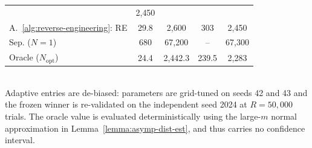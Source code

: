 \begin{table}[ht]
\begin{tabular}{l c c c c}
& 2{,}450\hspace{0.45em}{\scriptsize [2{,}420, 2{,}480]} \\
A.~\ref{alg:reverse-engineering}: RE
& 29.8\hspace{0.45em}{\scriptsize [29.2, 30.3]}
& 2{,}600\hspace{0.45em}{\scriptsize [2{,}570, 2{,}630]}
& 303\hspace{0.45em}{\scriptsize [298, 307]}
& 2{,}450\hspace{0.45em}{\scriptsize [2{,}420, 2{,}480]} \\
\midrule
Sep. ($N=1$)
& 680\hspace{0.45em}{\scriptsize [669, 691]}
& 67{,}200\hspace{0.45em}{\scriptsize [66{,}300, 68{,}300]}
& --
& 67{,}300\hspace{0.45em}{\scriptsize [66{,}300, 68{,}500]} \\
\midrule
Oracle ($N_\text{opt}$)
& 24.4
& 2{,}442.3
& 239.5
& 2{,}283 \\
\bottomrule
\end{tabular}
\\[2pt]
\footnotesize Adaptive entries are de-biased: parameters are grid-tuned on seeds 42 and 43 and the frozen winner is re-validated on the independent seed 2024 at $R=50{,}000$ trials. The oracle value is evaluated deterministically using the large-$m$ normal approximation in Lemma~\ref{lemma:asymp-dist-est}, and thus carries no confidence interval.
\end{table}
